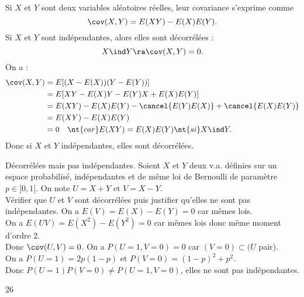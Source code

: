 \documentclass[11pt]{article}
\begin{document}
\begin{prop}{}{}
    Si $X$ et $Y$ sont deux variables aléatoires réelles, leur covariance s'exprime comme
    \begin{equation*}
        \cov(X,Y)=E(XY)-E(X)E(Y).
    \end{equation*}
    Si $X$ et $Y$ sont indépendantes, alors elles sont décorrélées :
    \begin{equation*}
        X \ind Y \ra \cov(X,Y)=0.
    \end{equation*}
    \tcblower
    On a :
    \begin{align*}
        \cov(X,Y)&=E[(X-E(X))(Y-E(Y))]\\
        &=E[XY-E(X)Y-E(Y)X+E(X)E(Y)]\\
        &=E(XY)-E(X)E(Y)-\cancel{E(Y)E(X)}+\cancel{E(X)E(Y)}\\
        &=E(XY)-E(X)E(Y)\\
        &=0 \quad \nt{car } E(XY)=E(X)E(Y) \nt{ si } X \ind Y.
    \end{align*}
    Donc si $X$ et $Y$ indépendantes, elles sont décorrélées.
\end{prop}

\begin{ex}{Décorrélées mais pas indépendantes.}{}
    Soient $X$ et $Y$ deux v.a. définies sur un espace probabilisé, indépendantes et de même loi de Bernoulli de paramètre $p\in]0,1[$. On note $U=X+Y$ et $V=X-Y$.\\
    Vérifier que $U$ et $V$ sont décorrélées puis justifier qu'elles ne sont pas indépendantes.
    \tcblower
    On a $E(V)=E(X)-E(Y)=0$ car mêmes lois.\\
    On a $E(UV)=E(X^2)-E(Y^2)=0$ car mêmes lois donc même moment d'ordre 2.\\
    Donc $\cov(U,V)=0$.\n
    On a $P(U=1,V=0)=0$ car $(V=0)\subset(U$ pair).\\
    On a $P(U=1)=2p(1-p)$ et $P(V=0)=(1-p)^2+p^2$.\\
    Donc $P(U=1)P(V=0)\neq P(U=1,V=0)$, elles ne sont pas indépendantes.
\end{ex}

\begin{ex}{}{}

\end{ex}

\begin{prop}{}{}

\end{prop}

\begin{prop}{}{26}

\end{prop}
\end{document}

